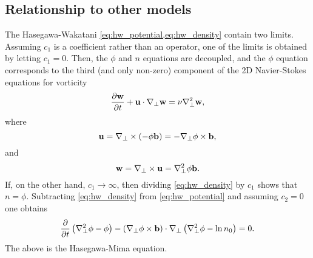 \documentclass[11pt]{article}
\begin{document}
\subsection{Relationship to other models}
The Hasegawa-Wakatani \cref{eq:hw_potential,eq:hw_density} contain two limits. Assuming $c_1$ is a coefficient rather than an operator, one of the limits is obtained by letting $c_1 = 0$. Then, the $\phi$ and $n$ equations are decoupled, and the $\phi$ equation corresponds to the third (and only non-zero) component of the 2D Navier-Stokes equations for vorticity
\begin{equation}
    \frac{\partial \mathbf{w}}{\partial t} + \mathbf{u} \cdot \nabla_\perp \mathbf{w} = \nu \nabla^2_\perp \mathbf{w},
\end{equation}
where
\begin{equation}
    \mathbf{u} = \nabla_\perp \times (-\phi \mathbf{b}) = - \nabla_\perp \phi \times \mathbf{b},
\end{equation}
and
\begin{equation}
    \mathbf{w} = \nabla_\perp \times \mathbf{u} = \nabla^2_\perp \phi \mathbf{b}.
\end{equation}
If, on the other hand, $c_1 \to \infty$, then dividing \cref{eq:hw_density} by $c_1$ shows that $n = \phi$. Subtracting \cref{eq:hw_density} from \cref{eq:hw_potential} and assuming $c_2=0$ one obtains 
\begin{equation}
    \frac{\partial}{\partial t} \left ( \nabla^2_\perp \phi - \phi \right ) - \left (\nabla_\perp \phi \times \mathbf{b} \right ) \cdot \nabla_\perp \left ( \nabla^2_\perp \phi - \ln n_0 \right ) = 0.
\end{equation}
The above is the Hasegawa-Mima equation.



\end{document}
